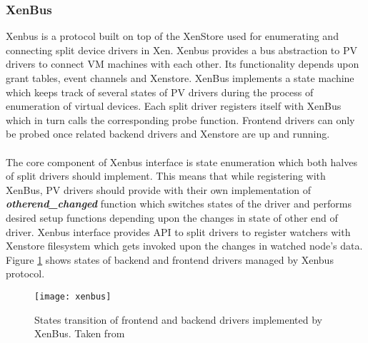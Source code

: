 \subsubsection{XenBus\label{sec:xenbus}} 
Xenbus \cite{Xenbus} is a protocol built on top of the XenStore used for enumerating and connecting split device drivers in Xen. Xenbus provides a bus abstraction to PV drivers to connect VM machines with each other. Its functionality depends upon grant tables, event channels and Xenstore. XenBus implements a state machine which keeps track of several states of PV drivers during the process of enumeration of virtual devices. Each split driver registers itself with XenBus which in turn calls the corresponding probe function. Frontend drivers can only be probed once related backend drivers and Xenstore are up and running.
\\
\\
The core component of Xenbus interface is state enumeration which both halves of split drivers should implement. This means that while registering with XenBus, PV drivers should provide with their own implementation of \textit{\textbf{otherend\_changed}} function which switches states of the driver and performs desired setup functions depending upon the changes in state of other end of driver. Xenbus interface provides API to split drivers to register watchers with Xenstore filesystem which gets invoked upon the changes in watched node's data. Figure \ref{xenbus} shows states of backend and frontend drivers managed by Xenbus protocol.

\begin{figure}[!htbp]
	\centering
	\texttt{[image: xenbus]}
	\caption{States transition of frontend and backend drivers implemented by XenBus. Taken from \cite{cho2007sharing}}
	\label{xenbus}
\end{figure}


